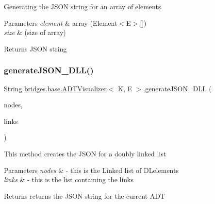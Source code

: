Generating the J\+S\+ON string for an array of elements


\begin{DoxyParams}{Parameters}
{\em element} & array (Element$<$\+E$>$\mbox{[}\mbox{]}) \\
\hline
{\em size} & (size of array)\\
\hline
\end{DoxyParams}
\begin{DoxyReturn}{Returns}
J\+S\+ON string 
\end{DoxyReturn}
\hypertarget{classbridges_1_1base_1_1_a_d_t_visualizer_a866df531965d152d5686304f07e15a4a}{}\label{classbridges_1_1base_1_1_a_d_t_visualizer_a866df531965d152d5686304f07e15a4a} 
\subsubsection{\texorpdfstring{generate\+J\+S\+O\+N\+\_\+\+D\+L\+L()}{generateJSON\_DLL()}}
{\footnotesize\ttfamily String \hyperlink{classbridges_1_1base_1_1_a_d_t_visualizer}{bridges.\+base.\+A\+D\+T\+Visualizer}$<$ K, E $>$.generate\+J\+S\+O\+N\+\_\+\+D\+LL (\begin{DoxyParamCaption}\item[{Linked\+List$<$ \hyperlink{classbridges_1_1base_1_1_d_lelement}{D\+Lelement}$<$ E $>$$>$}]{nodes,  }\item[{Linked\+List$<$ \hyperlink{classbridges_1_1base_1_1_d_lelement}{D\+Lelement}$<$ E $>$$>$}]{links }\end{DoxyParamCaption})}

This method creates the J\+S\+ON for a doubly linked list 
\begin{DoxyParams}{Parameters}
{\em nodes} & -\/ this is the Linked list of D\+Lelements \\
\hline
{\em links} & -\/ this is the list containing the links \\
\hline
\end{DoxyParams}
\begin{DoxyReturn}{Returns}
returns the J\+S\+ON string for the current A\+DT 
\end{DoxyReturn}
\hypertarget{classbridges_1_1base_1_1_a_d_t_visualizer_aabf7cbfbed0cd28b365206281176834b}{}\label{classbridges_1_1base_1_1_a_d_t_visualizer_aabf7cbfbed0cd28b365206281176834b} 
